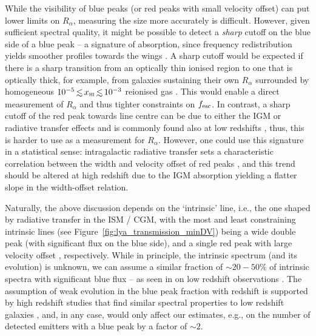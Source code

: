 \documentclass[fleqn,usenatbib]{mnras}
\begin{document}
While the visibility of blue peaks (or red peaks with small velocity offset) can put lower limits on $R_\alpha$, measuring the size more accurately is difficult. However, given sufficient spectral quality, it might be possible to detect a \textit{sharp} cutoff on the blue side of a blue peak -- a signature of absorption, since frequency redistribution yields smoother profiles towards the wings \citep{Neufeld1990}. A sharp cutoff would be expected if there is a sharp transition from an optically thin ionised region to one that is optically thick, for example, from galaxies sustaining their own $R_\alpha$ surrounded by homogeneous $10^{-5} \simlt \xHI \simlt 10^{-3}$ reionised gas \citep[which may be typical of the IGM at the end of reionisation  e.g.,][]{Fan2006}. This would enable a direct measurement of $R_\alpha$ and thus tighter constraints on $\fesc$. In contrast, a sharp cutoff of the red peak towards line centre can be due to either the IGM or radiative transfer effects and is commonly found also at low redshifts \citep[e.g.,][]{Rivera-Thorsen2015,Yang2017a}, thus, this is harder to use as a measurement for $R_\alpha$. However, one could use this signature in a statistical sense: intragalactic radiative transfer sets a characteristic correlation between the width and velocity offset of red \lya peaks \citep[e.g.,][]{Neufeld1990,Verhamme2018a}, and this trend should be altered at high redshift due to the IGM absorption yielding a flatter slope in the width-offset relation.

Naturally, the above discussion depends on the `intrinsic' \lya line, i.e., the one shaped by radiative transfer in the ISM / CGM, with the most and least constraining intrinsic lines (see Figure~\ref{fig:lya_transmission_minDV}) being a wide double peak (with significant flux on the blue side), and a single red peak with large velocity offset , respectively. While in principle, the intrinsic spectrum (and its evolution) is unknown, we can assume a similar fraction of $\sim 20-50\%$ of intrinsic spectra with significant blue flux -- as seen in on low redshift observations \citep{Yamanda2012,Henry2015,Yang2016,Rivera-Thorsen2015,Erb2014,Herenz2017}. The assumption of weak evolution in the blue peak fraction with redshift is supported by high redshift studies that find similar spectral properties to low redshift galaxies \citep{Matthee2017c,Songaila2018}, and, in any case, would only affect our estimates, e.g., on the number of detected \lya emitters with a blue peak by a factor of $\sim 2$.

\end{document}
